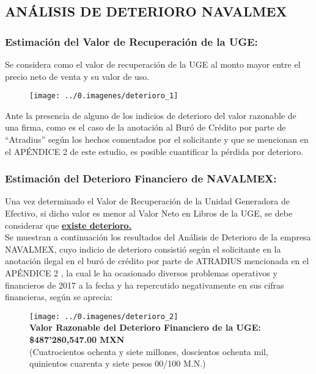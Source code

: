 \subsection{ANÁLISIS DE DETERIORO NAVALMEX}

\subsubsection{Estimación del Valor de Recuperación de la UGE:}

Se considera como el valor de recuperación de la UGE al monto mayor entre el  precio neto de venta y su valor de uso.\\

\begin{figure}[H]
\centering
\texttt{[image: ../0.imagenes/deterioro\_1]}
\end{figure}

Ante la presencia de alguno de los indicios de deterioro del valor razonable de una firma, como es el caso de la anotación al Buró de Crédito por parte de ``Atradius'' según los hechos comentados por el solicitante y que se mencionan en el APÉNDICE 2 de este estudio, es posible cuantificar la pérdida por deterioro.

\subsubsection{Estimación del Deterioro Financiero de NAVALMEX:}

Una vez determinado el Valor de Recuperación de la Unidad Generadora de Efectivo, si dicho valor es menor al Valor Neto en Libros de la UGE, se debe considerar que \textbf{\underline{existe deterioro.}} \\

Se muestran a continuación los resultados del Análisis de Deterioro de la empresa NAVALMEX, cuyo indicio de deterioro consistió según el solicitante en la anotación ilegal en el buró de crédito por parte de ATRADIUS mencionada en el APÉNDICE 2 , la cual le ha ocasionado diversos problemas operativos y financieros de 2017 a la fecha y ha repercutido negativamente en sus cifras financieras, según se aprecia:

\begin{figure}[H]
\centering
\texttt{[image: ../0.imagenes/deterioro\_2]}\\[10pt]

\textbullet \textcolor{principal}{\textbf{Valor Razonable del Deterioro Financiero de la UGE: }}\\[10pt]

\textcolor{principal}{\textbf{\$487’280,547.00 MXN}}\\[10pt]

(Cuatrocientos ochenta y siete millones, doscientos ochenta mil, \\
quinientos cuarenta y siete pesos 00/100 M.N.)


\end{figure}


